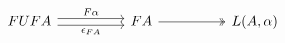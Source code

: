 \[\begin{tikzcd}
	FUFA && FA && {L(A,\alpha)}
	\arrow["F\alpha", shift left, from=1-1, to=1-3]
	\arrow["{\epsilon_{FA}}"', shift right, from=1-1, to=1-3]
	\arrow[two heads, from=1-3, to=1-5]
\end{tikzcd}\]